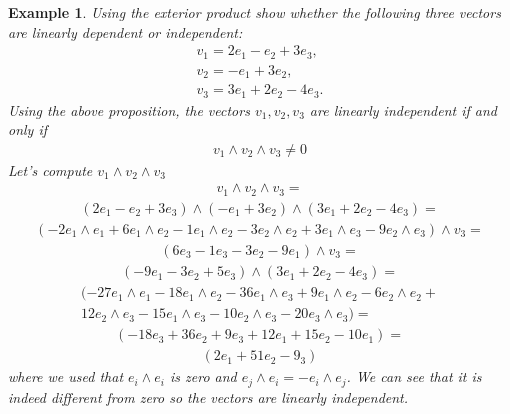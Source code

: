 \documentclass[12pt,a4paper]{article}
\newtheorem{exmp}{Example}[section]
\begin{document}
\begin{exmp}
Using the exterior product show whether the following three vectors are linearly dependent or independent:
\begin{align*}
v_1 = 2e_1 - e_2 +3 e_3,\\
v_2 = -e_1 + 3e_2,\\
v_3 = 3e_1 + 2e_2 - 4e_3.
\end{align*}
Using the above proposition, the vectors $v_1, v_2, v_3$ are linearly independent if and only if
\begin{align*}
v_1 \wedge v_2 \wedge v_3 \ne 0
\end{align*}
Let's compute $v_1 \wedge v_2 \wedge v_3$
\begin{align*}
v_1 \wedge v_2 \wedge v_3 =
\end{align*}
\begin{align*}
( 2e_1 - e_2 +3 e_3) \wedge ( -e_1 + 3e_2) \wedge (3e_1 + 2e_2 - 4e_3 ) =
\end{align*}
\begin{align*}
(-2 e_1 \wedge e_1 + 6 e_1 \wedge e_2  -1 e_1 \wedge e_2 -3 e_2 \wedge e_2 + 3 e_1 \wedge e_3 - 9 e_2\wedge e_3)\wedge v_3=
\end{align*}
\begin{align*}
(6 e_3 - 1 e_3 - 3 e_2 -9 e_1) \wedge v_3 =
\end{align*}
\begin{align*}
(-9 e_1 - 3 e_2 + 5 e_3) \wedge (3e_1 + 2e_2 - 4e_3) = 
\end{align*}
\begin{align*}
(- 27 e_1 \wedge e_1 - 18 e_1 \wedge e_2 - 36 e_1 \wedge e_3 + 9 e_1 \wedge e_2 - 6 e_2 \wedge e_2 +\\12 e_2 \wedge e_3 -15 e_1 \wedge e_3 - 10 e_2 \wedge e_3 -20 e_3 \wedge e_3) =
\end{align*}
\begin{align*}
(- 18 e_3 + 36 e_2 + 9 e_3 + 12 e_1 +15 e_2 -10 e_1) =
\end{align*}
\begin{align*}
(2 e_1 + 51 e_2  - 9_3)
\end{align*}
where we used that $e_i \wedge e_i$ is zero and $e_j \wedge e_i = - e_i \wedge e_j$. We can see that it is indeed different from zero so the vectors are linearly independent.
\end{exmp}
\end{document}

